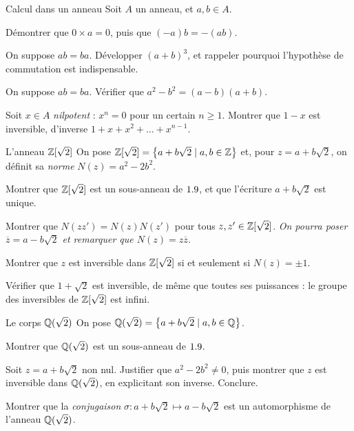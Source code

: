 \begin{exercice}[2]{Calcul dans un anneau}
Soit $A$ un anneau, et $a,b\in A$.
\begin{questions}
  \item Démontrer que $0\times a=0$, puis que $(-a)b=-(ab)$.
  \item On suppose $ab=ba$. Développer $(a+b)^{3}$, et rappeler pourquoi
    l'hypothèse de commutation est indispensable.
  \item On suppose $ab=ba$. Vérifier que $a^{2}-b^{2}=(a-b)(a+b)$.
  \item Soit $x\in A$ \emph{nilpotent} : $x^{n}=0$ pour un certain
    $n\geq1$. Montrer que $1-x$ est inversible, d'inverse
    $1+x+x^{2}+\dots+x^{n-1}$.
\end{questions}
\end{exercice}

\begin{exercice}[2]{L'anneau $\mathbb{Z}[\sqrt2]$}
On pose $\mathbb{Z}[\sqrt2]=\left\{a+b\sqrt2 \mid a,b\in\mathbb{Z}\right\}$ et, pour
$z=a+b\sqrt2$, on définit sa \emph{norme} $N(z)=a^{2}-2b^{2}$.
\begin{questions}
  \item Montrer que $\mathbb{Z}[\sqrt2]$ est un sous-anneau de $1.9$, et que
    l'écriture $a+b\sqrt2$ est unique.
  \item Montrer que $N(zz')=N(z)N(z')$ pour tous $z,z'\in\mathbb{Z}[\sqrt2]$.
    \emph{On pourra poser $\overline{z}=a-b\sqrt2$ et remarquer que
    $N(z)=z\overline{z}$.}
  \item Montrer que $z$ est inversible dans $\mathbb{Z}[\sqrt2]$ si et seulement
    si $N(z)=\pm1$.
  \item Vérifier que $1+\sqrt2$ est inversible, de même que toutes ses
    puissances : le groupe des inversibles de $\mathbb{Z}[\sqrt2]$ est infini.
\end{questions}
\end{exercice}

\begin{exercice}[2]{Le corps $\mathbb{Q}(\sqrt2)$}
On pose $\mathbb{Q}(\sqrt2)=\left\{a+b\sqrt2 \mid a,b\in\mathbb{Q}\right\}$.
\begin{questions}
  \item Montrer que $\mathbb{Q}(\sqrt2)$ est un sous-anneau de $1.9$.
  \item Soit $z=a+b\sqrt2$ non nul. Justifier que $a^{2}-2b^{2}\neq0$,
    puis montrer que $z$ est inversible dans $\mathbb{Q}(\sqrt2)$, en explicitant
    son inverse. Conclure.
  \item Montrer que la \emph{conjugaison}
    $\sigma:a+b\sqrt2\mapsto a-b\sqrt2$ est un automorphisme de l'anneau
    $\mathbb{Q}(\sqrt2)$.
\end{questions}
\end{exercice}

